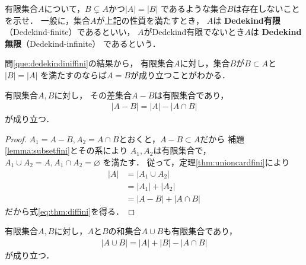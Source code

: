    \begin{que} \label{que:dedekindiniffini}
     有限集合$A$について，$B \subsetneq A$かつ$\lvert A \rvert = \lvert B \rvert$
     であるような集合$B$は存在しないことを示せ．
     一般に，集合$A$が上記の性質を満たすとき，
     $A$は
     \textbf{Dedekind有限}（Dedekind-finite）であるといい，
     $A$がDedekind有限でないとき$A$は
     \textbf{Dedekind無限}（Dedekind-infinite）
     であるという．
   \end{que}

   問\ref{que:dedekindiniffini}の結果から，
   有限集合$A$に対し，集合$B$が$B \subset A$と$\lvert B \rvert = \lvert A \rvert$
   を満たすのならば$A=B$が成り立つことがわかる．


   
   


   \begin{thm} \label{thm:diffini}
     有限集合$A,  B$に対し，
     その差集合$A-B$は有限集合であり，
     \begin{align}
       \lvert A-B \rvert = \lvert A \rvert - \lvert A \cap B \rvert 
       \label{eq:thm:diffini}
     \end{align}
     が成り立つ．
   \end{thm}

   \begin{proof}
     $A_1 = A-B,   A_2 = A \cap B$とおくと，$A - B \subset A$だから
     補題\ref{lemma:subsetfini}とその系により
     $A_1,  A_2$は有限集合で，$A_1 \cup A_2 = A,   A_1 \cap A_2 = \varnothing$
     を満たす．
     従って，定理\ref{thm:unioncardfini}により
     \begin{align*}
       \lvert A \rvert & = \lvert A_1 \cup A_2 \rvert \\
                       & = \lvert A_1 \rvert + \lvert A_2 \rvert \\
                       & = \lvert A-B \rvert + \lvert A \cap B \rvert 
     \end{align*}
     だから式\eqref{eq:thm:diffini}を得る．
   \end{proof}           

   \begin{thm} \label{thm:unionfini2}
     有限集合$A,  B$に対し，$A$と$B$の和集合$A \cup B$も有限集合であり，
     \begin{align}
       \lvert A \cup B \rvert = \lvert A \rvert + \lvert B \rvert - \lvert A \cap B \rvert
       \label{eq:unionfini2}
     \end{align}
     が成り立つ．
   \end{thm}

